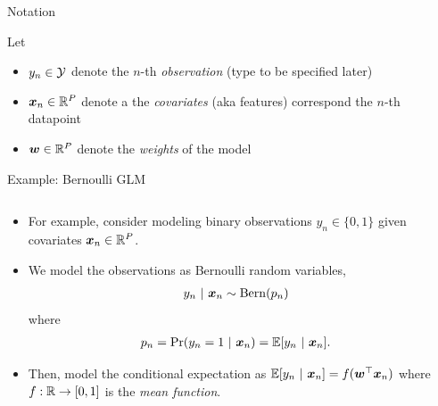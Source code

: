 \documentclass[aspectratio=169]{beamer}
\begin{document}
\begin{frame}[t]{Notation}

Let 
\begin{itemize}
    \item $y_n \in \mathcal{Y}$ denote the $n$-th \textit{observation} (type to be specified later)
    \item $\boldsymbol{x}_n \in \mathbb{R}^P$ denote a the \textit{covariates} (aka features) correspond the $n$-th datapoint
    \item $\boldsymbol{w} \in \mathbb{R}^P$ denote the \textit{weights} of the model
\end{itemize}

\end{frame}

\begin{frame}{Example: Bernoulli GLM}

\begin{columns}

\begin{column}{.5\textwidth}
\begin{itemize}
\item For example, consider modeling binary observations $y_n \in \{0,1\}$ given covariates $\boldsymbol{x}_n \in \mathbb{R}^P$.

\item We model the observations as Bernoulli random variables, 
\begin{align}
    y_n ~\vert~ \boldsymbol{x}_n &\sim \mathrm{Bern}(p_n)
\end{align}
where
\begin{align}
    p_n &= \Pr(y_n = 1 ~\vert~ \boldsymbol{x}_n)
    = \mathbb{E}[y_n ~\vert~ \boldsymbol{x}_n].
\end{align}

\item Then, model the conditional expectation as $\mathbb{E}[y_n ~\vert~ \boldsymbol{x}_n] = f(\boldsymbol{w}^\top \boldsymbol{x}_n)$ where $f: \mathbb{R} \to [0,1]$ is the \emph{mean function}.

\end{itemize}

\end{column}


\end{columns}
\end{frame}
\end{document}
